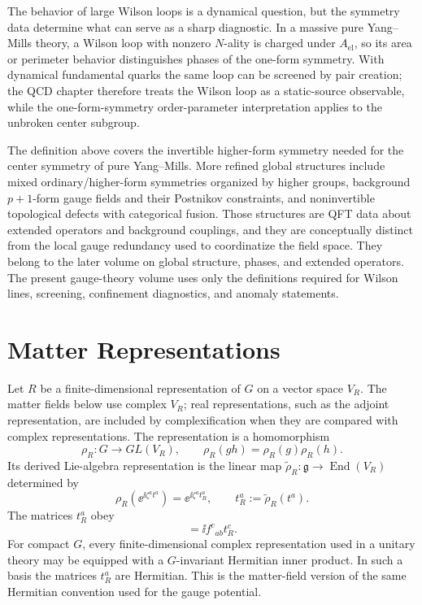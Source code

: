 The behavior of large Wilson loops is a dynamical question, but the symmetry
data determine what can serve as a sharp diagnostic.  In a massive pure
Yang--Mills theory, a Wilson loop with nonzero \(N\)-ality is charged under
\(A_{\mathrm{el}}\), so its area or perimeter behavior distinguishes phases of
the one-form symmetry.  With dynamical fundamental quarks the same loop can be
screened by pair creation; the QCD chapter therefore treats the Wilson loop as
a static-source observable, while the one-form-symmetry order-parameter
interpretation applies to the unbroken center subgroup.

\begin{remark}
\label{rem:categorical-symmetry-forward-pointer}
The definition above covers the invertible higher-form symmetry needed for the
center symmetry of pure Yang--Mills.  More refined global structures include
mixed ordinary/higher-form symmetries organized by higher groups, background
\(p+1\)-form gauge fields and their Postnikov constraints, and noninvertible
topological defects with categorical fusion.  Those structures are QFT data
about extended operators and background couplings, and they are conceptually
distinct from the local gauge redundancy used to coordinatize the field space.
They belong to the later volume on global structure, phases, and extended
operators.  The present gauge-theory volume uses only the definitions required
for Wilson lines, screening, confinement diagnostics, and anomaly statements.
\end{remark}

\section{Matter Representations}

Let \(R\) be a finite-dimensional representation of \(G\) on a vector space
\(V_R\).  The matter fields below use complex \(V_R\); real representations,
such as the adjoint representation, are included by complexification when they
are compared with complex representations.  The representation is a
homomorphism
\begin{equation}
  \rho_R:G\longrightarrow GL(V_R),
  \qquad
  \rho_R(gh)=\rho_R(g)\rho_R(h).
  \label{eq:ym-group-representation}
\end{equation}
Its derived Lie-algebra representation is the linear map
\(\widetilde\rho_R:\mathfrak g\to\operatorname{End}(V_R)\) determined by
\begin{equation}
  \rho_R(\ee^{\ii\zeta^a t^a})
  =
  \ee^{\ii\zeta^a t_R^a},
  \qquad
  t_R^a:=\widetilde\rho_R(t^a).
  \label{eq:ym-lie-algebra-representation}
\end{equation}
The matrices \(t_R^a\) obey
\begin{equation}
  [t_R^a,t_R^b]=\ii f^c{}_{ab}t_R^c.
  \label{eq:ym-representation-commutator}
\end{equation}
For compact \(G\), every finite-dimensional complex representation used in a
unitary theory may be equipped with a \(G\)-invariant Hermitian inner product.
In such a basis the matrices \(t_R^a\) are Hermitian.  This is the matter-field
version of the same Hermitian convention used for the gauge potential.


